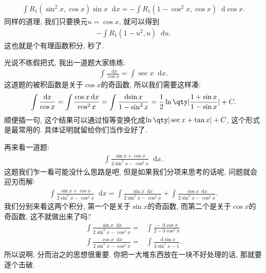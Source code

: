 \documentclass{ctexbook}
\newcommand*{\dif}{\mathop{}\!\mathrm{d}}
\begin{document}
{\begin{align*}
\int R_{1}(\sin^{2}{x},\cos{x})\sin{x}\dif{x}=-\int R_{1}(1-\cos^{2}{x},\cos{x})\dif{\cos{x}}
.\end{align*}
同样的道理, 我们只要换元$u=\cos{x}$, 就可以得到
\begin{align*}
-\int R_{1}(1-u^{2},u)\dif{u}
.\end{align*}
这也就是个有理函数积分, 秒了. \par
光说不练假把式, 我出一道题大家练练: 
\begin{align*}
\int\frac{\dif{x}}{\cos{x}}=\int\sec{x}\dif{x}
.\end{align*}
这道题的被积函数是关于$\cos{x}$的奇函数, 所以我们需要这样凑: 
\begin{align*}
\int\frac{\dif{x}}{\cos{x}}=\int\frac{\cos{x}\dif{x}}{\cos^{2}{x}}=\int\frac{\dif{\sin{x}}}{1-\sin^{2}{x}}=\frac{1}{2}\ln\qty|\frac{1+\sin{x}}{1-\sin{x}}|+C
.\end{align*}
顺便插一句, 这个结果可以通过恒等变换化成$\ln\qty|\sec{x}+\tan{x}|+C$, 这个形式是最常用的. 具体证明就留给你们当作业好了. \par
再来看一道题: 
\begin{align*}
\int\frac{\sin{x}+\cos{x}}{2\sin^{2}{x}-\cos^{2}{x}}\dif{x}
.\end{align*}
这题我们乍一看可能没什么思路是吧, 但是如果我们分项来思考的话呢, 问题就会迎刃而解: 
\begin{align*}
\int\frac{\sin{x}+\cos{x}}{2\sin^{2}{x}-\cos^{2}{x}}\dif{x}=\int\frac{\sin{x}\dif{x}}{2\sin^{2}{x}-\cos^{2}{x}}+\int\frac{\cos{x}\dif{x}}{2\sin^{2}{x}-\cos^{2}{x}}
.\end{align*}
我们分别来看这两个积分, 第一个是关于$\sin{x}$的奇函数, 而第二个是关于$\cos{x}$的奇函数, 这不就做出来了吗? 
\begin{align*}
\int\frac{\sin{x}\dif{x}}{2\sin^{2}{x}-\cos^{2}{x}}={}&\int\frac{-\dif{\cos{x}}}{2-3\cos^{2}{x}}\\
\int\frac{\cos{x}\dif{x}}{2\sin^{2}{x}-\cos^{2}{x}}={}&\int\frac{\dif{\sin{x}}}{3\sin^{2}{x}-1}
.\end{align*}
所以说啊, 分而治之的思想很重要. 你把一大堆东西放在一块不好处理的话, 那就要逐个击破. \par
}
\end{document}
